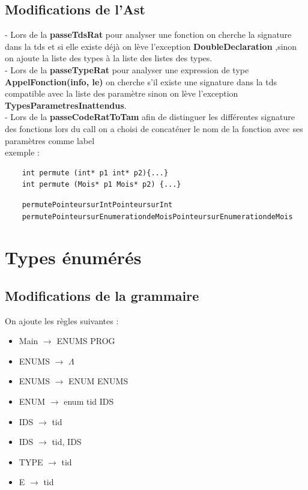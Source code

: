 \documentclass{article}
\begin{document}
\subsection{Modifications de l'Ast}
- Lors de la \textbf{passeTdsRat} pour analyser une fonction on cherche la signature dans la tds et si elle existe déjà on lève l'exception \textbf{DoubleDeclaration}
,sinon on ajoute la liste des types à la liste des listes des types. \\
- Lors de la \textbf{passeTypeRat} pour analyser une expression de type \textbf{AppelFonction(info, le)} on cherche s'il existe une signature dans la tds
compatible avec la liste des paramètre sinon on lève l'exception \textbf{TypesParametresInattendus}. \\
- Lors de la \textbf{passeCodeRatToTam} afin de distinguer les différentes signature des fonctions lors du call on a choisi de concaténer le nom de la fonction avec ses 
paramètres comme label\\
exemple : 
\begin{verbatim}
    int permute (int* p1 int* p2){...}
    int permute (Mois* p1 Mois* p2) {...}
\end{verbatim}
\begin{verbatim}
    permutePointeursurIntPointeursurInt
    permutePointeursurEnumerationdeMoisPointeursurEnumerationdeMois
\end{verbatim}
\section{Types énumérés}
\subsection{Modifications de la grammaire}
On ajoute les règles suivantes :
\begin{itemize}
    \item Main $\rightarrow$ ENUMS PROG
    \item ENUMS $\rightarrow$ $\Lambda$
    \item ENUMS $\rightarrow$ ENUM ENUMS
    \item ENUM $\rightarrow$ enum tid {IDS}
    \item IDS $\rightarrow$ tid
    \item IDS $\rightarrow$ tid, IDS
    \item TYPE $\rightarrow$ tid
    \item E $\rightarrow$ tid
\end{itemize}
\end{document}
